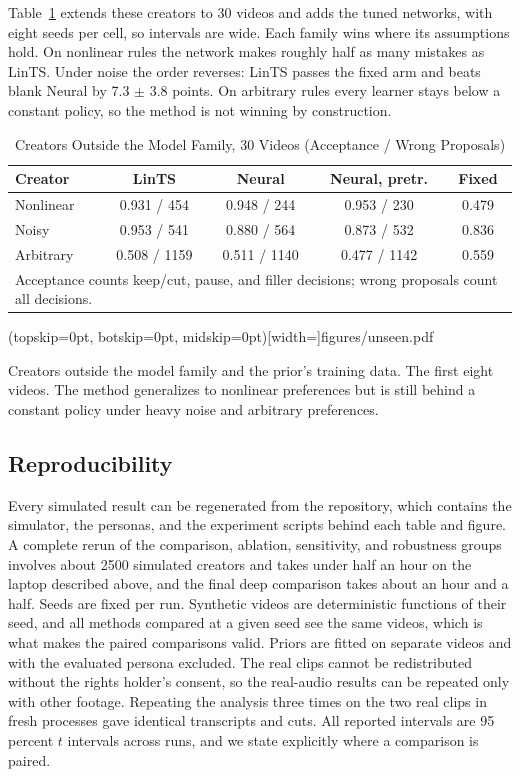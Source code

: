 \documentclass{ieeeaccess}
\begin{document}
Table~\ref{tab:outside} extends these creators to 30 videos and adds the tuned networks, with eight seeds per cell, so intervals are wide. Each family wins where its assumptions hold. On nonlinear rules the network makes roughly half as many mistakes as LinTS. Under noise the order reverses: LinTS passes the fixed arm and beats blank Neural by 7.3 $\pm$ 3.8 points. On arbitrary rules every learner stays below a constant policy, so the method is not winning by construction.

\begin{table}[t]
\caption{Creators Outside the Model Family, 30 Videos (Acceptance / Wrong Proposals)}
\label{tab:outside}
\setlength{\tabcolsep}{3pt}
\centering
\begin{tabular}{|l|c|c|c|c|}
\hline
Creator & LinTS & Neural & Neural, pretr. & Fixed \\
\hline
Nonlinear & 0.931 / 454 & 0.948 / 244 & 0.953 / 230 & 0.479 \\
Noisy & 0.953 / 541 & 0.880 / 564 & 0.873 / 532 & 0.836 \\
Arbitrary & 0.508 / 1159 & 0.511 / 1140 & 0.477 / 1142 & 0.559 \\
\hline
\multicolumn{5}{p{80mm}}{Acceptance counts keep/cut, pause, and filler decisions; wrong proposals count all decisions.}
\end{tabular}
\end{table}

\Figure[t!](topskip=0pt, botskip=0pt, midskip=0pt)[width=\textwidth]{figures/unseen.pdf}
{\parbox[t]{0.91\textwidth}{\raggedright Creators outside the model family and the prior's training data. The first eight videos. The method generalizes to nonlinear preferences but is still behind a constant policy under heavy noise and arbitrary preferences.}\label{fig:unseen}}

\subsection{Reproducibility}
Every simulated result can be regenerated from the repository, which contains the simulator, the personas, and the experiment scripts behind each table and figure. A complete rerun of the comparison, ablation, sensitivity, and robustness groups involves about 2500 simulated creators and takes under half an hour on the laptop described above, and the final deep comparison takes about an hour and a half. Seeds are fixed per run. Synthetic videos are deterministic functions of their seed, and all methods compared at a given seed see the same videos, which is what makes the paired comparisons valid. Priors are fitted on separate videos and with the evaluated persona excluded. The real clips cannot be redistributed without the rights holder's consent, so the real-audio results can be repeated only with other footage. Repeating the analysis three times on the two real clips in fresh processes gave identical transcripts and cuts. All reported intervals are 95 percent $t$ intervals across runs, and we state explicitly where a comparison is paired.
\end{document}
